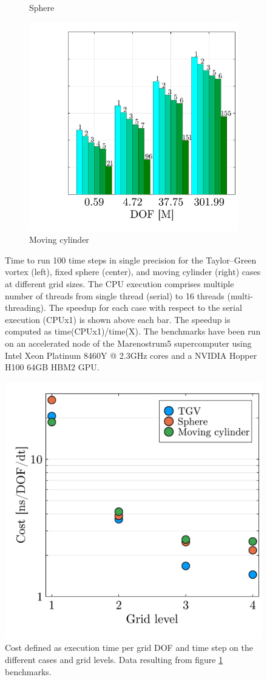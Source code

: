 \documentclass[final,3p,times]{elsarticle}
\begin{document}
\begin{figure}[!ht]
\begin{subfigure}[t]{0.33\linewidth}
    \caption{Sphere}
  \end{subfigure}
  \begin{subfigure}[t]{0.33\linewidth}
    \centering\hspace*{-0.2cm}
    \includegraphics[width=\linewidth]{img/cylinder_benchmark.pdf}
    \caption{Moving cylinder}
  \end{subfigure}
	\caption{Time to run 100 time steps in single precision for the Taylor--Green vortex (left), fixed sphere (center), and moving cylinder (right) cases at different grid sizes. The CPU execution comprises multiple number of threads from single thread (serial) to 16 threads (multi-threading). The speedup for each case with respect to the serial execution (CPUx1) is shown above each bar. The speedup is computed as time(CPUx1)/time(X). The benchmarks have been run on an accelerated node of the Marenostrum5 supercomputer using Intel Xeon Platinum 8460Y @ 2.3GHz cores and a NVIDIA Hopper H100 64GB HBM2 GPU.}
	\label{fig:benchmarks}
\end{figure}

\begin{figure}[!ht]
  \centering
  \includegraphics[width=0.4\linewidth]{img/cost.pdf}
\caption{Cost defined as execution time per grid DOF and time step on the different cases and grid levels. Data resulting from figure \ref{fig:benchmarks} benchmarks.}
\label{fig:cost}
\end{figure}
\end{document}
